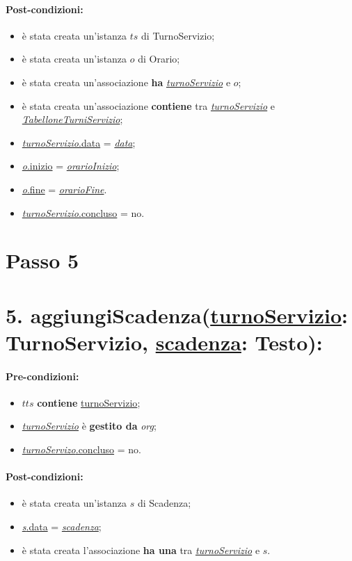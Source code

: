 \paragraph{Post-condizioni:}
\begin{itemize}
   \item è stata creata un'istanza $ts$ di TurnoServizio;
   \item è stata creata un'istanza $o$ di Orario;
   \item è stata creata un'associazione \textbf{ha} \underline{\textit{turnoServizio}} e $o$;
    \item è stata creata un'associazione \textbf{contiene} tra \underline{\textit{turnoServizio}} e \underline{\textit{TabelloneTurniServizio}};
   \item \underline{\textit{turnoServizio}.data} = \underline{\textit{data}};
    \item \underline{\textit{o}.inizio}  = \underline{\textit{orarioInizio}};
    \item \underline{\textit{o}.fine}  = \underline{\textit{orarioFine}}.
    \item \underline{\textit{turnoServizio}.concluso}  = no.
\end{itemize}


\section{Passo 5}
\section*{5. aggiungiScadenza(\underline{turnoServizio}: TurnoServizio, \underline{scadenza}: Testo):}

\paragraph{Pre-condizioni:}
\begin{itemize}
  \item $tts$ \textbf{contiene} \underline{turnoServizio};
     \item \underline{\textit{turnoServizio}} è \textbf{gestito da} {\textit{org}};
   \item \underline{\textit{turnoServizo}.concluso} = no.
\end{itemize}

\paragraph{Post-condizioni:}  
\begin{itemize}
 \item è stata creata un'istanza $s$ di Scadenza;
 \item \underline{\textit{s}.data} = \underline{\textit{scadenza}};
 \item è stata creata l'associazione \textbf{ha una} tra \underline{\textit{turnoServizio}} e $s$.
\end{itemize}

